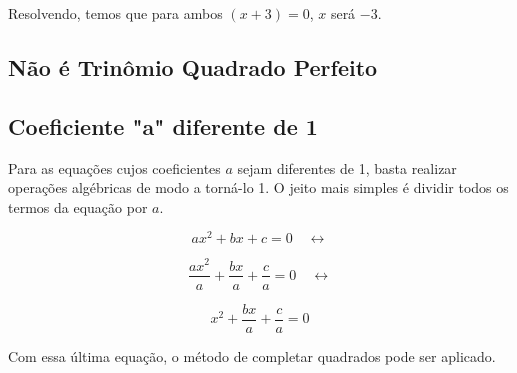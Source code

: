 \documentclass[../resumo.tex]{subfiles}
\begin{document}
	Resolvendo, temos que para ambos $(x + 3) = 0$, $x$ será $-3$. 

	\subsection{Não é Trinômio Quadrado Perfeito}

	\subsection{Coeficiente "a" diferente de 1}

	Para as equações cujos coeficientes $a$ sejam diferentes de 1, basta
	realizar operações algébricas de modo a torná-lo 1. O jeito mais simples
	é dividir todos os termos da equação por $a$.

	\[ax^2 + bx + c = 0 \quad \leftrightarrow \]

	\[\frac{ax^2}{a} + \frac{bx}{a} + \frac{c}{a} = 0 \quad \leftrightarrow \]

	\[x^2 + \frac{bx}{a} + \frac{c}{a} = 0\]

	Com essa última equação, o método de completar quadrados pode ser aplicado.
\end{document}
